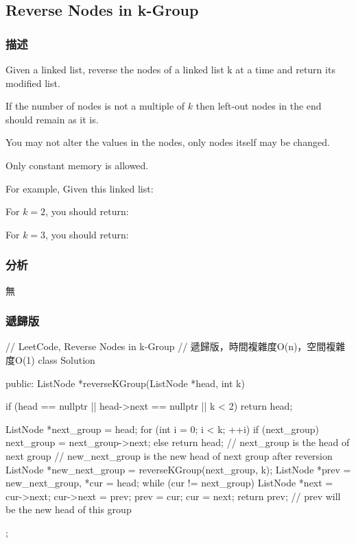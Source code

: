 \subsection{Reverse Nodes in k-Group}
\label{sec:reverse-nodes-in-k-group}


\subsubsection{描述}
Given a linked list, reverse the nodes of a linked list k at a time and return its modified list.

If the number of nodes is not a multiple of $k$ then left-out nodes in the end should remain as it is.

You may not alter the values in the nodes, only nodes itself may be changed.

Only constant memory is allowed.

For example,
Given this linked list: 

For $k = 2$, you should return: 

For $k = 3$, you should return: 


\subsubsection{分析}
無


\subsubsection{遞歸版}
\begin{Code}
// LeetCode, Reverse Nodes in k-Group
// 遞歸版，時間複雜度O(n)，空間複雜度O(1)
class Solution {
public:
    ListNode *reverseKGroup(ListNode *head, int k) {
        if (head == nullptr || head->next == nullptr || k < 2)
            return head;

        ListNode *next_group = head;
        for (int i = 0; i < k; ++i) {
            if (next_group)
                next_group = next_group->next;
            else
                return head;
        }
        // next_group is the head of next group
        // new_next_group is the new head of next group after reversion
        ListNode *new_next_group = reverseKGroup(next_group, k);
        ListNode *prev = new_next_group, *cur = head;
        while (cur != next_group) {
            ListNode *next = cur->next;
            cur->next = prev;
            prev = cur;
            cur = next;
        }
        return prev; // prev will be the new head of this group
    }
};
\end{Code}


